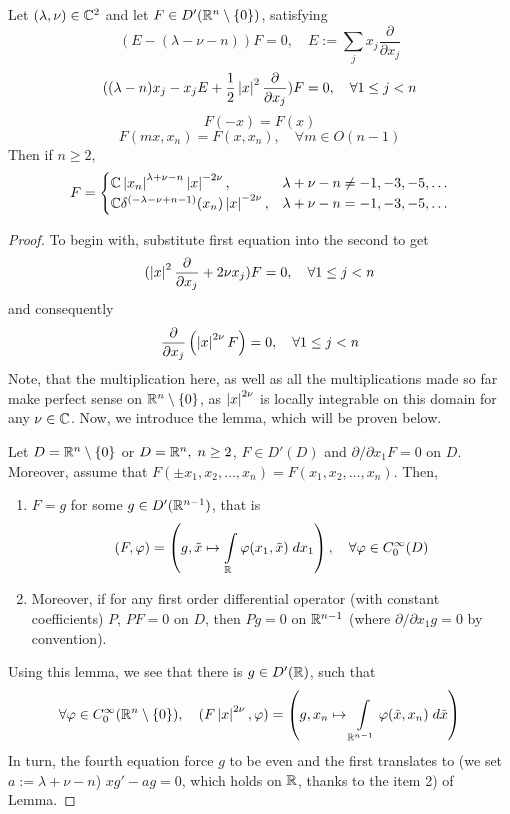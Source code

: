 \documentclass[10pt]{article} %
\begin{document}
\begin{myprop}
	Let $(\lambda,\nu)\in\mathbb{C}^2$ and let $F\in D'(\mathbb{R}^n\setminus\left\{0\right\})$, satisfying
	\[(E-(\lambda-\nu-n))F=0,\quad E:=\sum_jx_j\frac{\partial}{\partial x_j}\]
	\[((\lambda-n)x_j-x_jE+\frac{1}{2}\left|x\right|^2\frac{\partial}{\partial x_j})F=0,\quad\forall1\leq j<n\]
	\[F(-x)=F(x)\]
	\[F(mx,x_n)=F(x,x_n),\quad \forall m\in O(n-1)\]
	Then if $n\geq2$,
	\[F=\begin{cases}
		\mathbb{C}\left|x_n\right|^{\lambda+\nu-n}\left|x\right|^{-2\nu},&\lambda+\nu-n\neq-1,-3,-5,\hdots\\
		\mathbb{C}\delta^{\left(-\lambda-\nu+n-1\right)}(x_n)\left|x\right|^{-2\nu},&\lambda+\nu-n=-1,-3,-5,\hdots
	\end{cases}\]
	\end{myprop}
	\begin{proof}
		To begin with, substitute first equation into the second to get
		\[(\left|x\right|^2\frac{\partial}{\partial x_j}+2\nu x_j)F=0,\quad\forall1\leq j<n\]
		and consequently
		\[\frac{\partial}{\partial x_j}\left(\left|x\right|^{2\nu} F\right)=0,\quad\forall1\leq j<n\]
		Note, that the multiplication here, as well as all the multiplications made so far make perfect sense on $\mathbb{R}^n\setminus
		\left\{0\right\}$, as $\left|x\right|^{2\nu}$ is locally integrable on this domain for any $\nu\in\mathbb{C}$.
		Now, we introduce the lemma, which will be proven below.
		\begin{mylem}\label{Lemma}
			Let $D=\mathbb{R}^n\setminus\left\{0\right\}$ or $D=\mathbb{R}^n,\;n\geq2$,
			$F\in D'(D)$ and $\partial/\partial x_1F=0$ on $D$. Moreover, assume that
			$F(\pm x_1,x_2,\hdots,x_n)=F(x_1,x_2,\hdots,x_n)$. Then,
			\begin{enumerate}
				\item $F=g$ for some $g\in D'(\mathbb{R}^{n-1})$, that is
				\begin{equation}
					(F,\phi)=\mybra{g,\tilde{x}\mapsto\int_\R\phi(x_1,\tilde{x})\;dx_1},\quad\forall \phi\in C^\infty_0(D)\label{FandG}
				\end{equation}
				\item Moreover, if for any first order differential operator (with constant coefficients)
					$P$, $PF=0$ on $D$, then $Pg=0$ on $\mathbb{R}^{n-1}$ (where $\partial/\partial x_1g=0$ by convention).
			\end{enumerate}
		\end{mylem}
		Using this lemma, we see that there is $g\in D'(\mathbb{R})$, such that 
		\[\forall \phi\in C^\infty_0(\R^n\setminus\mycbra{0}),\quad (F\myabs{x}^{2\nu}
		,\phi)=\mybra{g,x_n\mapsto\int_{\R^{n-1}}\phi(\tilde{x},x_n)\;d\tilde{x}} \]
		In turn, the fourth equation force $g$ to be even and the first translates to (we set $a:=\lambda+\nu-n$)
		$xg'-ag=0$, which holds on $\mathbb{R}$, thanks to the item 2) of Lemma.


\end{proof}
\end{document}
